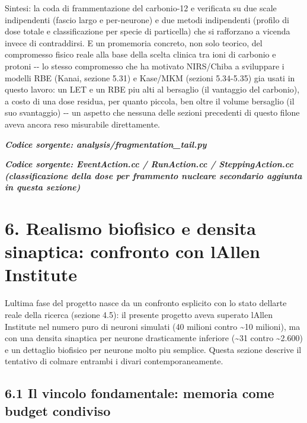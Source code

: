 \documentclass[
  italian,
]{article}
\begin{document}
Sintesi: la coda di frammentazione del carbonio-12 e\textquotesingle{} verificata su due scale indipendenti (fascio largo e per-neurone) e due metodi indipendenti (profilo di dose totale e classificazione per specie di particella) che si rafforzano a vicenda invece di contraddirsi. E\textquotesingle{} un promemoria concreto, non solo teorico, del compromesso fisico reale alla base della scelta clinica tra ioni di carbonio e protoni -\/- lo stesso compromesso che ha motivato NIRS/Chiba a sviluppare i modelli RBE (Kanai, sezione 5.31) e Kase/MKM (sezioni 5.34-5.35) gia\textquotesingle{} usati in questo lavoro: un LET e un RBE piu\textquotesingle{} alti al bersaglio (il vantaggio del carbonio), a costo di una dose residua, per quanto piccola, ben oltre il volume bersaglio (il suo svantaggio) -\/- un aspetto che nessuna delle sezioni precedenti di questo filone aveva ancora reso misurabile direttamente.

\textit{\textbf{Codice sorgente: analysis/fragmentation\_\allowbreak{}tail.py}}


\textit{\textbf{Codice sorgente: EventAction.cc / RunAction.cc / SteppingAction.cc (classificazione della dose per frammento nucleare secondario aggiunta in questa sezione)}}




\section{6. Realismo biofisico e densita\textquotesingle{} sinaptica: confronto con l\textquotesingle Allen Institute}\label{realismo-biofisico-e-densita-sinaptica-confronto-con-lallen-institute}

L\textquotesingle ultima fase del progetto nasce da un confronto esplicito con lo stato dell\textquotesingle arte reale della ricerca (sezione 4.5): il presente progetto aveva superato l\textquotesingle Allen Institute nel numero puro di neuroni simulati (40 milioni contro \textasciitilde10 milioni), ma con una densita\textquotesingle{} sinaptica per neurone drasticamente inferiore (\textasciitilde31 contro \textasciitilde2.600) e un dettaglio biofisico per neurone molto piu\textquotesingle{} semplice. Questa sezione descrive il tentativo di colmare entrambi i divari contemporaneamente.

\subsection{6.1 Il vincolo fondamentale: memoria come budget condiviso}\label{il-vincolo-fondamentale-memoria-come-budget-condiviso}
\end{document}
